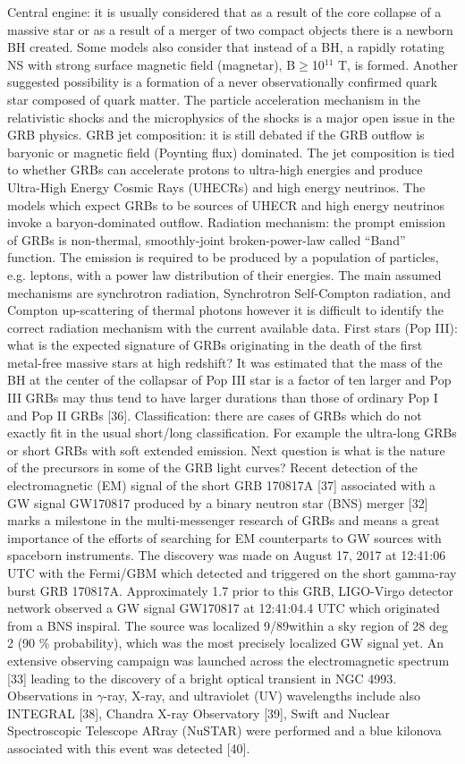\documentclass[12pt, a4paper,titlepage]{article}
\numberwithin{equation}{section}
\numberwithin{figure}{section}
\begin{document}
Central engine: it is usually considered that as a result of the core collapse of a massive star or as a result of a merger of two compact objects there is a newborn BH created. Some models also consider that instead of a BH, a rapidly rotating NS with strong surface magnetic field (magnetar), B$\geqslant	$10$^{11}$ T, is formed. Another suggested possibility is a formation of a never observationally confirmed quark star composed of quark matter.
The particle acceleration mechanism in the relativistic shocks and the microphysics of the shocks is a major open issue in the GRB physics. 
GRB jet composition: it is still debated if the GRB outflow is baryonic or magnetic field (Poynting flux) dominated. The jet composition is tied to whether GRBs can accelerate protons to ultra-high energies and produce Ultra-High Energy Cosmic Rays (UHECRs) and high energy neutrinos. The models which expect GRBs to be sources of UHECR and high energy neutrinos invoke a baryon-dominated outflow.
Radiation mechanism: the prompt emission of GRBs is non-thermal, smoothly-joint broken-power-law called “Band” function. The emission is required to be produced by a population of particles, e.g. leptons, with a power law distribution of their energies. The main assumed mechanisms are synchrotron radiation, Synchrotron Self-Compton radiation, and Compton up-scattering of thermal photons however it is difficult to identify the correct radiation mechanism with the current available
data.
First stars (Pop III): what is the expected signature of GRBs originating in the death of the first metal-free massive stars at high redshift? It was estimated that the mass of the BH at the center of the collapsar of Pop III star is a factor of ten larger and Pop III GRBs may thus tend to have larger durations than those of ordinary Pop I and Pop II GRBs [36].
Classification: there are cases of GRBs which do not exactly fit in the usual short/long classification.
For example the ultra-long GRBs or short GRBs with soft extended emission. Next question is what is
the nature of the precursors in some of the GRB light curves?
Recent detection of the electromagnetic (EM) signal of the short GRB 170817A [37] associated with a GW signal GW170817 produced by a binary neutron star (BNS) merger [32] marks a milestone in the multi-messenger research of GRBs and means a great importance of the efforts of searching for EM counterparts to GW sources with spaceborn instruments. The discovery was made on August 17, 2017 at 12:41:06 UTC with the Fermi/GBM which detected and triggered on the short gamma-ray burst GRB 170817A. Approximately 1.7 prior to this GRB, LIGO-Virgo detector network observed a GW signal GW170817 at 12:41:04.4 UTC which originated from a BNS inspiral. The source was localized 9/89within a sky region of 28 deg 2 (90 \% probability), which was the most precisely localized GW signal yet. An extensive observing campaign was launched across the electromagnetic spectrum [33] leading to the discovery of a bright optical transient in NGC 4993. Observations in $\gamma$-ray, X-ray, and ultraviolet (UV) wavelengths include also INTEGRAL [38], Chandra X-ray Observatory [39], Swift and Nuclear Spectroscopic Telescope ARray (NuSTAR) were performed and a blue kilonova associated with this event was detected [40].
\end{document}
